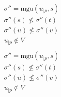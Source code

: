 \begin{figure}[htb]
  \begin{center}

    \DP{} \\[12pt]

    \DP{}
    $\begin{matrix}
        \sigma'' = \text{mgu}(u_{|p}, s) \\
        \sigma''(s) \not\leq \sigma''(t) \\
        \sigma''(u) \not\leq \sigma''(v) \\
        u_{|p} \not\in V \\
    \end{matrix}$ \\[12pt]

    \DP{}
    $\begin{matrix}
        \sigma'' = \text{mgu}(u_{|p}, s) \\
        \sigma''(s) \not\leq \sigma''(t) \\
        \sigma''(u) \not\leq \sigma''(v) \\
        u_{|p} \not\in V \\
    \end{matrix}$ \\[12pt]

    \doubleLine{}
    \DP{} \\[12pt]

    \doubleLine{}
    \DP{} \\[12pt]



\end{center}
\end{figure}

